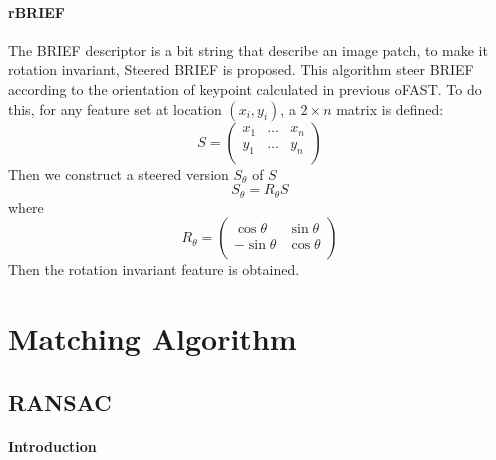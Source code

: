 \documentclass[paper=a4, fontsize=11pt]{scrartcl} %
\numberwithin{equation}{section} %
\numberwithin{figure}{section} %
\numberwithin{table}{section} %
\begin{document}
\paragraph{rBRIEF}
The BRIEF descriptor is a bit string that describe an image patch, to make it rotation invariant, Steered BRIEF is proposed. 
This algorithm steer BRIEF according to the orientation of keypoint calculated in previous oFAST.
To do this, for any feature set at location $(x_i, y_i)$, a $2 \times n$ matrix is defined:
$$
S = 
\begin{pmatrix}
x_1&\dots&x_n \\
y_1&\dots&y_n \\
\end{pmatrix}
$$
Then we construct a steered version $S_\theta$ of $S$
$$
S_\theta = R_\theta S
$$
where 
$$
R_\theta = 
\begin{pmatrix}
\cos \theta & \sin \theta \\
-\sin \theta & \cos \theta \\
\end{pmatrix}
$$
Then the rotation invariant feature is obtained.



\section{Matching Algorithm}


\subsection{RANSAC}
\paragraph{Introduction}

\end{document}
